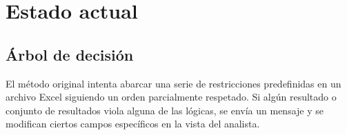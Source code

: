 \documentclass{article}
\begin{document}
%
%
%


%


\newpage
\section{Estado actual}

\subsection{Árbol de decisión}

El método original intenta abarcar una serie de restricciones predefinidas en un archivo Excel siguiendo un orden parcialmente respetado. Si algún resultado o conjunto de resultados viola alguna de las lógicas, se envía un mensaje y se modifican ciertos campos específicos en la vista del analista.
\end{document}
